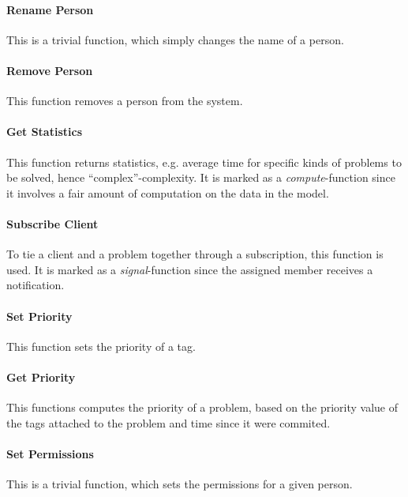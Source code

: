 \paragraph{Rename Person} This is a trivial function, which simply changes the name of a person.

\paragraph{Remove Person} This function removes a person from the system.


\paragraph{Get Statistics} This function returns statistics, e.g. average time for specific kinds of problems to be solved, hence ``complex''-complexity. It is marked as a \textit{compute}-function since it involves a fair amount of computation on the data in the model.

\paragraph{Subscribe Client} To tie a client and a problem together through a subscription, this function is used. It is marked as a \textit{signal}-function since the assigned \astaff[] member receives a notification. 

\paragraph{Set Priority} This function sets the priority of a tag. 

\paragraph{Get Priority} This functions computes the priority of a problem, based on the priority value of the tags attached to the problem and time since it were commited.



\paragraph{Set Permissions} This is a trivial function, which sets the permissions for a given person.
